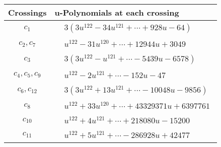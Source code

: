 \documentclass[1p]{elsarticle_modified}
\theoremstyle{definition}
\begin{document}
\begin{tabular}{m{50pt}|m{274pt}}
Crossings & \hspace{64pt}u-Polynomials at each crossing \\
\hline $$\begin{aligned}c_{1}\end{aligned}$$&$\begin{aligned}
&3(3 u^{122}-34 u^{121}+\cdots+928 u-64)
\end{aligned}$\\
\hline $$\begin{aligned}c_{2},c_{7}\end{aligned}$$&$\begin{aligned}
&u^{122}-31 u^{120}+\cdots+12944 u+3049
\end{aligned}$\\
\hline $$\begin{aligned}c_{3}\end{aligned}$$&$\begin{aligned}
&3(3 u^{122}- u^{121}+\cdots-5439 u-6578)
\end{aligned}$\\
\hline $$\begin{aligned}c_{4},c_{5},c_{9}\end{aligned}$$&$\begin{aligned}
&u^{122}-2 u^{121}+\cdots-152 u-47
\end{aligned}$\\
\hline $$\begin{aligned}c_{6},c_{12}\end{aligned}$$&$\begin{aligned}
&3(3 u^{122}+13 u^{121}+\cdots-10048 u-9856)
\end{aligned}$\\
\hline $$\begin{aligned}c_{8}\end{aligned}$$&$\begin{aligned}
&u^{122}+33 u^{120}+\cdots+43329371 u+6397761
\end{aligned}$\\
\hline $$\begin{aligned}c_{10}\end{aligned}$$&$\begin{aligned}
&u^{122}+4 u^{121}+\cdots+218080 u-15200
\end{aligned}$\\
\hline $$\begin{aligned}c_{11}\end{aligned}$$&$\begin{aligned}
&u^{122}+5 u^{121}+\cdots-286928 u+42477
\end{aligned}$\\
\hline
\end{tabular}\\~\\
\end{document}
